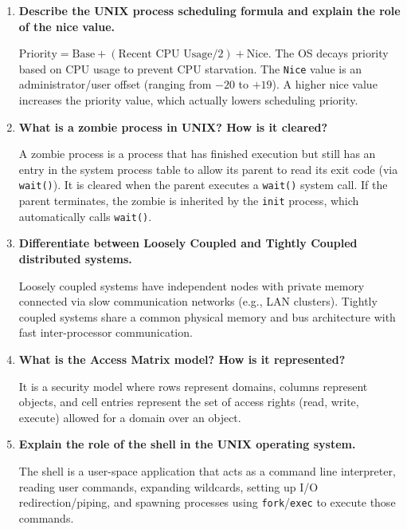 \documentclass[12pt,a4paper]{article}
\newcommand{\Q}[1]{\textbf{#1}\par\noindent\ignorespaces}
\begin{document}
\begin{tcolorbox}[exambox, title={\textbf{Frequently Asked / Viva Questions}}]
\begin{enumerate}[topsep=0pt, label=\textbf{Q\arabic*.}, itemsep=5pt]
  \item \Q{Describe the UNIX process scheduling formula and explain the role of the nice value.}
    $\text{Priority} = \text{Base} + (\text{Recent CPU Usage} / 2) + \text{Nice}$. The OS decays priority based on CPU usage to prevent CPU starvation. The \texttt{Nice} value is an administrator/user offset (ranging from $-20$ to $+19$). A higher nice value increases the priority value, which actually lowers scheduling priority.
  \item \Q{What is a zombie process in UNIX? How is it cleared?}
    A zombie process is a process that has finished execution but still has an entry in the system process table to allow its parent to read its exit code (via \texttt{wait()}). It is cleared when the parent executes a \texttt{wait()} system call. If the parent terminates, the zombie is inherited by the \texttt{init} process, which automatically calls \texttt{wait()}.
  \item \Q{Differentiate between Loosely Coupled and Tightly Coupled distributed systems.}
    Loosely coupled systems have independent nodes with private memory connected via slow communication networks (e.g., LAN clusters). Tightly coupled systems share a common physical memory and bus architecture with fast inter-processor communication.
  \item \Q{What is the Access Matrix model? How is it represented?}
    It is a security model where rows represent domains, columns represent objects, and cell entries represent the set of access rights (read, write, execute) allowed for a domain over an object.
  \item \Q{Explain the role of the shell in the UNIX operating system.}
    The shell is a user-space application that acts as a command line interpreter, reading user commands, expanding wildcards, setting up I/O redirection/piping, and spawning processes using \texttt{fork}/\texttt{exec} to execute those commands.
\end{enumerate}
\end{tcolorbox}
\end{document}
